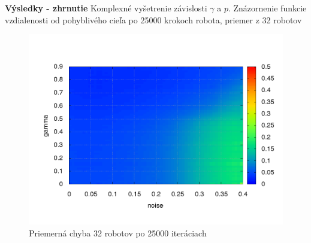 \documentclass[xcolor=dvipsnames]{beamer}
\begin{document}
\begin{frame}{\bf Výsledky - zhrnutie}
Komplexné vyšetrenie závislosti $\gamma$ a $p$. Znázornenie funkcie vzdialenosti od pohyblivého cieľa po 25000 krokoch robota, priemer z 32 robotov

\begin{figure}[!htb]
\centering
\includegraphics[scale=.35]{../../results_q_learning/nano_q_learning/summary_result_average_error_map.png}
\caption{Priemerná chyba 32 robotov po 25000 iteráciach}
\label{img:nano_q_summary}
\end{figure}

\end{frame}
\end{document}
